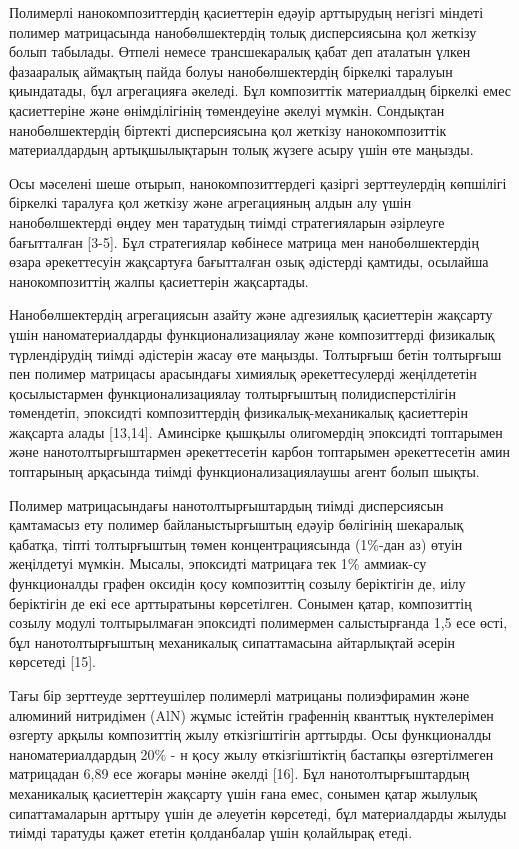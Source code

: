 \begin{multicols}{2}
Полимерлі нанокомпозиттердің қасиеттерін едәуір арттырудың негізгі
міндеті полимер матрицасында нанобөлшектердің толық дисперсиясына қол
жеткізу болып табылады. Өтпелі немесе трансшекаралық қабат деп аталатын
үлкен фазааралық аймақтың пайда болуы нанобөлшектердің біркелкі таралуын
қиындатады, бұл агрегацияға әкеледі. Бұл композиттік материалдың
біркелкі емес қасиеттеріне және өнімділігінің төмендеуіне әкелуі мүмкін.
Сондықтан нанобөлшектердің біртекті дисперсиясына қол жеткізу
нанокомпозиттік материалдардың артықшылықтарын толық жүзеге асыру үшін
өте маңызды.

Осы мәселені шеше отырып, нанокомпозиттердегі қазіргі зерттеулердің
көпшілігі біркелкі таралуға қол жеткізу және агрегацияның алдын алу үшін
нанобөлшектерді өңдеу мен таратудың тиімді стратегияларын әзірлеуге
бағытталған {[}3-5{]}. Бұл стратегиялар көбінесе матрица мен
нанобөлшектердің өзара әрекеттесуін жақсартуға бағытталған озық
әдістерді қамтиды, осылайша нанокомпозиттің жалпы қасиеттерін
жақсартады.

Нанобөлшектердің агрегациясын азайту және адгезиялық қасиеттерін
жақсарту үшін наноматериалдарды функционализациялау және композиттерді
физикалық түрлендірудің тиімді әдістерін жасау өте маңызды. Толтырғыш
бетін толтырғыш пен полимер матрицасы арасындағы химиялық
әрекеттесулерді жеңілдететін қосылыстармен функционализациялау
толтырғыштың полидисперстілігін төмендетіп, эпоксидті композиттердің
физикалық-механикалық қасиеттерін жақсарта алады {[}13,14{]}. Аминсірке
қышқылы олигомердің эпоксидті топтарымен және нанотолтырғыштармен
әрекеттесетін карбон топтарымен әрекеттесетін амин топтарының арқасында
тиімді функционализациялаушы агент болып шықты.

Полимер матрицасындағы нанотолтырғыштардың тиімді дисперсиясын
қамтамасыз ету полимер байланыстырғыштың едәуір бөлігінің шекаралық
қабатқа, тіпті толтырғыштың төмен концентрациясында (1\%-дан аз) өтуін
жеңілдетуі мүмкін. Мысалы, эпоксидті матрицаға тек 1\% аммиак-су
функционалды графен оксидін қосу композиттің созылу беріктігін де, иілу
беріктігін де екі есе арттыратыны көрсетілген. Сонымен қатар,
композиттің созылу модулі толтырылмаған эпоксидті полимермен
салыстырғанда 1,5 есе өсті, бұл нанотолтырғыштың механикалық
сипаттамасына айтарлықтай әсерін көрсетеді {[}15{]}.

Тағы бір зерттеуде зерттеушілер полимерлі матрицаны полиэфирамин және
алюминий нитридімен (AlN) жұмыс істейтін графеннің кванттық нүктелерімен
өзгерту арқылы композиттің жылу өткізгіштігін арттырды. Осы функционалды
наноматериалдардың 20\% - н қосу жылу өткізгіштіктің бастапқы
өзгертілмеген матрицадан 6,89 есе жоғары мәніне әкелді {[}16{]}. Бұл
нанотолтырғыштардың механикалық қасиеттерін жақсарту үшін ғана емес,
сонымен қатар жылулық сипаттамаларын арттыру үшін де әлеуетін көрсетеді,
бұл материалдарды жылуды тиімді таратуды қажет ететін қолданбалар үшін
қолайлырақ етеді.


\end{multicols}
